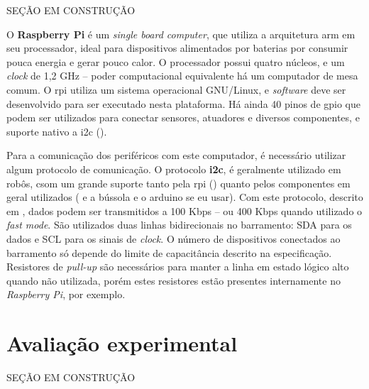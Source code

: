 SEÇÃO EM CONSTRUÇÃO


O \textbf{Raspberry Pi} é um \emph{single board computer}, que utiliza a arquitetura \acrshort{arm} em seu processador, ideal para dispositivos alimentados por baterias por consumir pouca energia e gerar pouco calor. O processador possui quatro núcleos, e um \emph{clock} de 1,2 GHz -- poder computacional equivalente há um computador de mesa comum. O \acrshort{rpi} utiliza um sistema operacional GNU/Linux, e \emph{software} deve ser desenvolvido para ser executado nesta plataforma. Há ainda 40 pinos de \acrshort{gpio} que podem ser utilizados para conectar sensores, atuadores e diversos componentes, e suporte nativo a \acrshort{i2c} (\cite{upton2014raspberry}).


Para a comunicação dos periféricos com este computador, é necessário utilizar algum protocolo de comunicação. O protocolo \textbf{\acrlong{i2c}}, é geralmente utilizado em robôs, csom um grande suporte tanto pela \acrshort{rpi} (\cite{upton2014raspberry}) quanto pelos componentes em geral utilizados (\cite{MPU6050} e a bússola e o arduino se eu usar). Com este protocolo, descrito em \cite{semiconductors2000i2c}, dados podem ser transmitidos a 100 Kbps -- ou 400 Kbps quando utilizado o \emph{fast mode}. São utilizados duas linhas bidirecionais no barramento: SDA para os dados e SCL para os sinais de \emph{clock}. O número de dispositivos conectados ao barramento só depende do limite de capacitância descrito na especificação. Resistores de \emph{pull-up} são necessários para manter a linha em estado lógico alto quando não utilizada, porém estes resistores estão presentes internamente no \emph{Raspberry Pi}, por exemplo.


\section{Avaliação experimental}
\label{sec:experimental}

SEÇÃO EM CONSTRUÇÃO
